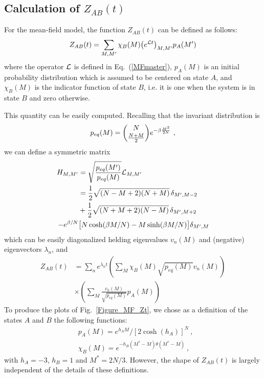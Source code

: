 \documentclass[aps,twocolumn,floats,pre,amsmath,superscriptaddress]{revtex4}
\newcommand{\beq}{\begin{equation}}
\newcommand{\eeq}{\end{equation}}
\let\l=\lambda \let\m=\mu \let\n=\nu \let\x=\xi \let\p=\pi
\newcommand{\<}{\langle}
\renewcommand{\>}{\rangle}
\begin{document}
\subsection{Calculation of $Z_{AB}(t)$}

For the mean-field model, the function $Z_{AB}(t)$ can be defined as follows:
\beq
Z_{AB}(t) = \sum_{M,M'} \chi_B(M) \big( e^{\LL t} \big)_{M,M'} p_A(M')
\eeq
where the operator ${\cal L}$ is defined in Eq.~(\ref{MFmaster}), $p_A(M)$ is an
initial probability distribution which is assumed to be centered on state $A$,
and $\chi_B(M)$ is the indicator function of state $B$, i.e. it is one when the
system is in state $B$ and zero otherwise.

This quantity
can be easily computed. Recalling that the invariant distribution is 
\beq
p_{eq}(M) = \binom{N}{\frac{N+M}2} e^{-\b \frac{M^2}{2N}} \ ,
\eeq
we can define a symmetric matrix
\beq\begin{split}
H_{M,M'} & = \sqrt{\frac{p_{eq}(M')}{p_{eq}(M)}} \LL_{M,M'} \\
& = \frac12 \sqrt{(N-M+2)(N+M)} \, \d_{M',M-2} \\
& + \frac12 \sqrt{(N+M+2)(N-M)} \, \d_{M',M+2} \\
 -e^{\b/N}  & \big[ N  \cosh(\b M/N) - M \sinh(\b M/N) \big] \d_{M',M}
\end{split}\eeq
which can be easily diagonalized helding eigenvalues $v_n(M)$ and 
(negative) eigenvectors $\l_n$, and 
\beq\label{ZABMF}
\begin{split}
Z_{AB}(t) & = \sum_{n} e^{\l_n t} 
 \left(\sum_{M} \chi_B(M) \sqrt{p_{eq}(M)} v_n(M) \right) \\
& \times \left(\sum_{M}  \frac{v_n(M)}{\sqrt{p_{eq}(M)}} p_A(M) \right)
\end{split}\eeq
To produce the plots of Fig.~\ref{Figure_MF_Zt}, 
we chose as a definition of the states $A$ and $B$ the following functions:
\beq\begin{split}
&p_A(M) = e^{h_A M}/[2 \cosh(h_A)]^N \ , \\
&\chi_B(M) = e^{-h_B (M^* - M) \theta(M^* - M)} \ ,
\end{split}\eeq
with $h_A = -3$, $h_B = 1$ and $M^* = 2N/3$. 
However, the shape of $Z_{AB}(t)$ is largely independent of the 
details of these definitions.
\end{document}
